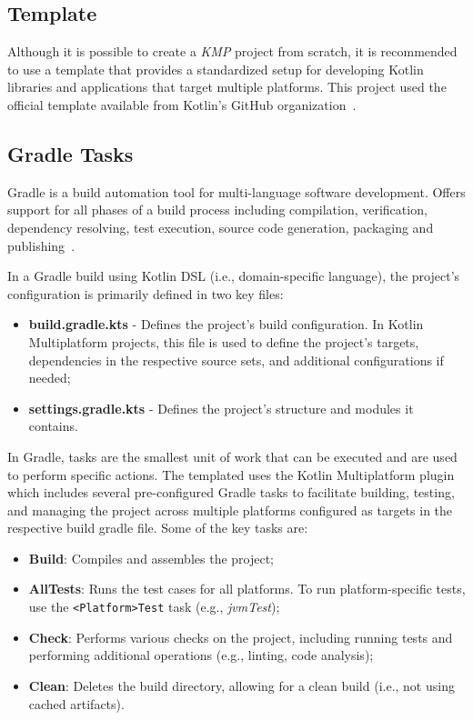\subsection{Template}\label{subsec:template}

Although it is possible to create a \textit{KMP} project from scratch, it is recommended to use a template that provides a standardized setup for developing Kotlin libraries and applications that target multiple platforms.
This project used the official template available from Kotlin's GitHub organization~\cite{kmp-github-template}.

\subsection{Gradle Tasks}\label{subsec:available-gradle-tasks}

Gradle is a build automation tool for multi-language software development.
Offers support for all phases of a build process including compilation, verification, dependency resolving, test execution, source code generation, packaging and publishing~\cite{wiki:gradle}.

In a Gradle build using Kotlin DSL (i.e., domain-specific language), the project's configuration is primarily defined in two key files:

\begin{itemize}
    \item \textbf{build.gradle.kts} - Defines the project's build configuration.
    In Kotlin Multiplatform projects, this file is used to define the project's targets, dependencies in the respective source sets, and additional configurations if needed;
    \item \textbf{settings.gradle.kts} - Defines the project's structure and modules it contains.
\end{itemize}

In Gradle, tasks are the smallest unit of work that can be executed and are used to perform specific actions.
The templated uses the Kotlin Multiplatform plugin which includes several pre-configured Gradle tasks to facilitate building, testing, and managing the project across multiple platforms configured as targets in the respective build gradle file.
Some of the key tasks are:

\begin{itemize}
    \item \textbf{Build}: Compiles and assembles the project;
    \item \textbf{AllTests}: Runs the test cases for all platforms.
    To run platform-specific tests, use the \texttt{<Platform>Test} task (e.g., \textit{jvmTest});
    \item \textbf{Check}: Performs various checks on the project, including running tests and performing additional operations (e.g., linting, code analysis);
    \item \textbf{Clean}: Deletes the build directory, allowing for a clean build (i.e., not using cached artifacts).
\end{itemize}

